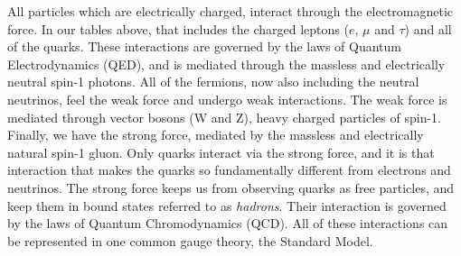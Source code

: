 All particles which are electrically charged, interact through the electromagnetic force. In our tables above, that includes the charged leptons ($e$, $\mu$ and $\tau$) and all of the quarks. These interactions are governed by the laws of Quantum Electrodynamics (QED), and is mediated through the massless and electrically neutral spin-1 photons. All of the fermions, now also including the neutral neutrinos, feel the weak force and undergo weak interactions. The weak force is mediated through vector bosons (W and Z), heavy charged particles of spin-1. Finally, we have the strong force, mediated by the massless and electrically natural spin-1 gluon. Only quarks interact via the strong force, and it is that interaction that makes the quarks so fundamentally different from electrons and neutrinos. The strong force keeps us from observing quarks as free particles, and keep them in bound states referred to as \emph{hadrons}. Their interaction is governed by the laws of Quantum Chromodynamics (QCD). All of these interactions can be represented in one common gauge theory, the Standard Model.

